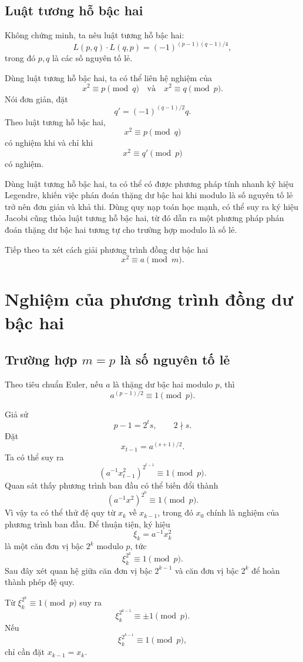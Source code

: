 \documentclass[11pt]{article}
\begin{document}
\subsection{Luật tương hỗ bậc hai}

Không chứng minh, ta nêu luật tương hỗ bậc hai:
\[
  L(p,q)\cdot L(q,p)=(-1)^{(p-1)(q-1)/4},
\]
trong đó $p,q$ là các số nguyên tố lẻ.

Dùng luật tương hỗ bậc hai, ta có thể liên hệ nghiệm của
\[
  x^2\equiv p\pmod q
  \quad\text{và}\quad
  x^2\equiv q\pmod p.
\]
Nói đơn giản, đặt
\[
  q'=(-1)^{(q-1)/2}q.
\]
Theo luật tương hỗ bậc hai,
\[
  x^2\equiv p\pmod q
\]
có nghiệm khi và chỉ khi
\[
  x^2\equiv q'\pmod p
\]
có nghiệm.

Dùng luật tương hỗ bậc hai, ta có thể có được phương pháp tính nhanh ký hiệu
Legendre, khiến việc phán đoán thặng dư bậc hai khi modulo là số nguyên tố lẻ
trở nên đơn giản và khả thi. Dùng quy nạp toán học mạnh, có thể suy ra ký hiệu
Jacobi cũng thỏa luật tương hỗ bậc hai, từ đó dẫn ra một phương pháp phán đoán
thặng dư bậc hai tương tự cho trường hợp modulo là số lẻ.

Tiếp theo ta xét cách giải phương trình đồng dư bậc hai
\[
  x^2\equiv a\pmod m.
\]

\section{Nghiệm của phương trình đồng dư bậc hai}

\subsection{Trường hợp \texorpdfstring{$m=p$}{m=p} là số nguyên tố lẻ}

Theo tiêu chuẩn Euler, nếu $a$ là thặng dư bậc hai modulo $p$, thì
\[
  a^{(p-1)/2}\equiv 1\pmod p.
\]

Giả sử
\[
  p-1=2^t s,\qquad 2\nmid s.
\]
Đặt
\[
  x_{t-1}=a^{(s+1)/2}.
\]
Ta có thể suy ra
\[
  (a^{-1}x_{t-1}^2)^{2^{t-1}}\equiv 1\pmod p.
\]
Quan sát thấy phương trình ban đầu có thể biến đổi thành
\[
  (a^{-1}x^2)^{2^0}\equiv 1\pmod p.
\]
Vì vậy ta có thể thử đệ quy từ $x_k$ về $x_{k-1}$, trong đó $x_0$ chính là
nghiệm của phương trình ban đầu. Để thuận tiện, ký hiệu
\[
  \xi_k=a^{-1}x_k^2
\]
là một căn đơn vị bậc $2^k$ modulo $p$, tức
\[
  \xi_k^{2^k}\equiv 1\pmod p.
\]
Sau đây xét quan hệ giữa căn đơn vị bậc $2^{k-1}$ và căn đơn vị bậc $2^k$ để
hoàn thành phép đệ quy.

Từ $\xi_k^{2^k}\equiv 1\pmod p$ suy ra
\[
  \xi_k^{2^{k-1}}\equiv \pm 1\pmod p.
\]
Nếu
\[
  \xi_k^{2^{k-1}}\equiv 1\pmod p,
\]
chỉ cần đặt $x_{k-1}=x_k$.
\end{document}
